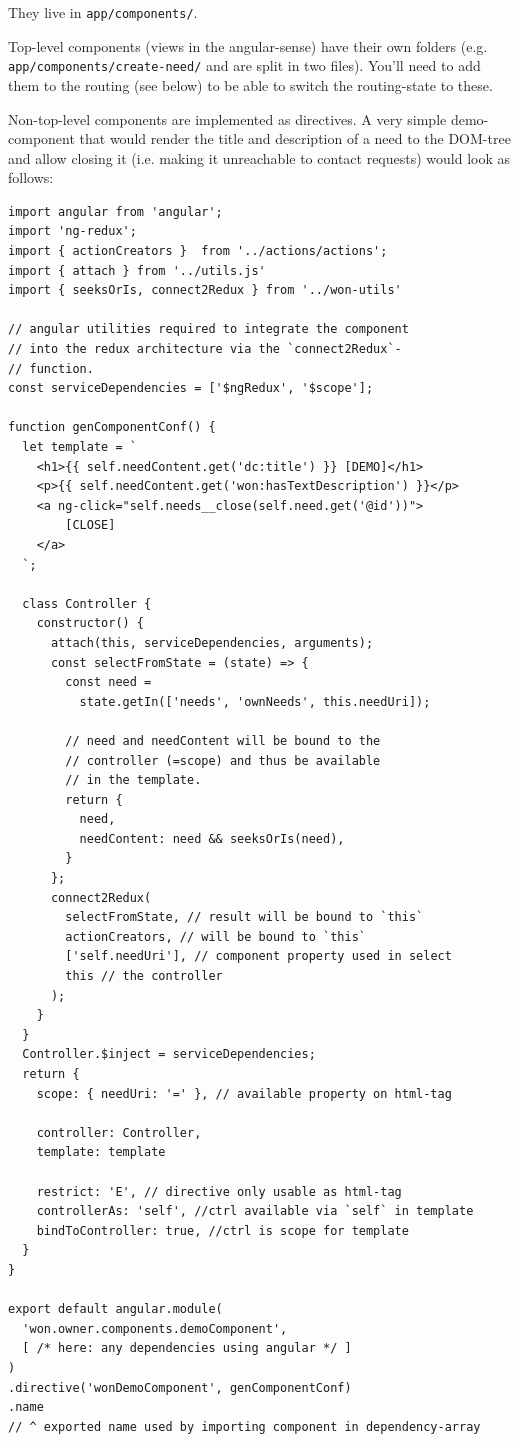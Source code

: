 They live in \texttt{app/components/}. %

Top-level components (views in the angular-sense) have their own folders
(e.g. \texttt{app/components/create-need/} and are split in two files).
You'll need to add them to the routing (see below) to be able to switch
the routing-state to these.

Non-top-level components are implemented as directives. A very simple 
demo-component that would render the title and description of a need to
the DOM-tree and allow closing it (i.e. making it unreachable to contact
requests) would look as follows:

\begin{verbatim}
import angular from 'angular';
import 'ng-redux';
import { actionCreators }  from '../actions/actions';
import { attach } from '../utils.js'
import { seeksOrIs, connect2Redux } from '../won-utils'

// angular utilities required to integrate the component
// into the redux architecture via the `connect2Redux`-
// function.
const serviceDependencies = ['$ngRedux', '$scope'];

function genComponentConf() {
  let template = `
  	<h1>{{ self.needContent.get('dc:title') }} [DEMO]</h1>
  	<p>{{ self.needContent.get('won:hasTextDescription') }}</p>
  	<a ng-click="self.needs__close(self.need.get('@id'))">
        [CLOSE]
    </a>
  `;

  class Controller {
    constructor() {
      attach(this, serviceDependencies, arguments);
      const selectFromState = (state) => {
        const need =
          state.getIn(['needs', 'ownNeeds', this.needUri]); 

        // need and needContent will be bound to the 
        // controller (=scope) and thus be available
        // in the template.
        return { 
          need,
          needContent: need && seeksOrIs(need),
        }
      };
      connect2Redux(
        selectFromState, // result will be bound to `this` 
        actionCreators, // will be bound to `this`
        ['self.needUri'], // component property used in select
        this // the controller
      );
    }
  }
  Controller.$inject = serviceDependencies;
  return {
    scope: { needUri: '=' }, // available property on html-tag

    controller: Controller,
    template: template

    restrict: 'E', // directive only usable as html-tag
    controllerAs: 'self', //ctrl available via `self` in template
    bindToController: true, //ctrl is scope for template
  }
}

export default angular.module(
  'won.owner.components.demoComponent', 
  [ /* here: any dependencies using angular */ ] 
)
.directive('wonDemoComponent', genComponentConf)
.name 
// ^ exported name used by importing component in dependency-array
\end{verbatim}



